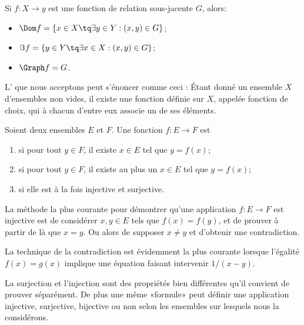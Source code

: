 \begin{remark}\label{RemLienFctRelation}
	Si \( f: X \to y \) est une fonction de relation sous-jacente \( G \), alors:
	\begin{itemize}
		\item \( \Dom f = \{ x \in X \tq \exists y \in Y: (x, y) \in G\} \);
		\item \( \Im f = \{ y \in Y \tq \exists x \in X: (x, y) \in G\} \);
		\item \( \Graph f = G \).
	\end{itemize}
\end{remark}

\begin{normaltext}\label{NORooLMBYooYjUoju}
	L' que nous acceptons peut s'énoncer comme ceci\cite{ooKLIXooHbpufL} : Étant donné un ensemble \( X\) d'ensembles non vides, il existe une fonction définie sur \( X\), appelée fonction de choix, qui à chacun d'entre eux associe un de ses éléments.
\end{normaltext}

\begin{definition}\label{DefooInjSurjBij}
	Soient deux ensembles \( E\) et \( F\). Une fonction \( f\colon E\to F\) est
	\begin{enumerate}
		\item
		       si pour tout \( y\in F\), il existe \( x\in E\) tel que \( y=f(x)\);
		\item
		       si pour tout \( y\in F\), il existe au plus un \(x\in E \) tel que \( y=f(x)\);
		\item
		       si elle est à la fois injective et surjective.
	\end{enumerate}
\end{definition}


\begin{normaltext}\label{NORMooMethodePreuveInj}
	La méthode la plus courante pour démontrer qu'une application \( f\colon E\to F\) est injective est de considérer \( x,y\in E\) tels que \( f(x)=f(y)\), et de prouver à partir de là que \( x=y\). Ou alors de supposer \( x\neq y\) et d'obtenir une contradiction.

	La technique de la contradiction est évidemment la plus courante lorsque l'égalité \( f(x)=g(x)\) implique une équation faisant intervenir \( 1/(x-y)\).

	La surjection et l'injection sont des propriétés bien différentes qu'il convient de prouver séparément. De plus une même «formule» peut définir une application injective, surjective, bijective ou non selon les ensembles sur lesquels nous la considérons.
\end{normaltext}

